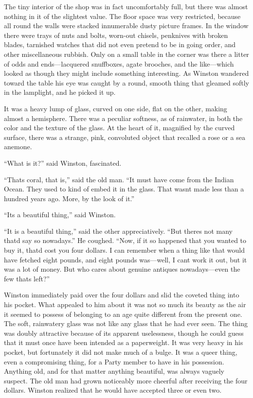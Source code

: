 The tiny interior of the shop was in fact uncomfortably full, but there
was almost nothing in it of the slightest value. The floor space was
very restricted, because all round the walls were stacked innumerable
dusty picture frames. In the window there were trays of nuts and bolts,
worn-out chisels, penknives with broken blades, tarnished watches that
did not even pretend to be in going order, and other miscellaneous
rubbish. Only on a small table in the corner was there a litter of odds
and ends---lacquered snuffboxes, agate brooches, and the like---which
looked as though they might include something interesting. As Winston
wandered toward the table his eye was caught by a round, smooth thing
that gleamed softly in the lamplight, and he picked it up.

It was a heavy lump of glass, curved on one side, flat on the other,
making almost a hemisphere. There was a peculiar softness, as of
rainwater, in both the color and the texture of the glass. At the heart
of it, magnified by the curved surface, there was a strange, pink,
convoluted object that recalled a rose or a sea anemone.

``What is it?'' said Winston, fascinated.

``That\textquotesingle s coral, that is,'' said the old man. ``It must have
come from the Indian Ocean. They used to kind of embed it in the glass.
That wasn\textquotesingle t made less than a hundred years ago. More, by
the look of it.''

``It\textquotesingle s a beautiful thing,'' said Winston.

``It is a beautiful thing,'' said the other appreciatively. ``But
there\textquotesingle s not many that\textquotesingle d say so
nowadays.'' He coughed. ``Now, if it so happened that you wanted to buy
it, that\textquotesingle d cost you four dollars. I can remember when a
thing like that would have fetched eight pounds, and eight pounds
was---well, I can\textquotesingle t work it out, but it was a lot of
money. But who cares about genuine antiques nowadays---even the few
that\textquotesingle s left?''

Winston immediately paid over the four dollars and slid the coveted
thing into his pocket. What appealed to him about it was not so much its
beauty as the air it seemed to possess of belonging to an age quite
different from the present one. The soft, rainwatery glass was not like
any glass that he had ever seen. The thing was doubly attractive because
of its apparent uselessness, though he could guess that it must once
have been intended as a paperweight. It was very heavy in his pocket,
but fortunately it did not make much of a bulge. It was a queer thing,
even a compromising thing, for a Party member to have in his possession.
Anything old, and for that matter anything beautiful, was always vaguely
suspect. The old man had grown noticeably more cheerful after receiving
the four dollars. Winston realized that he would have accepted three or
even two.

